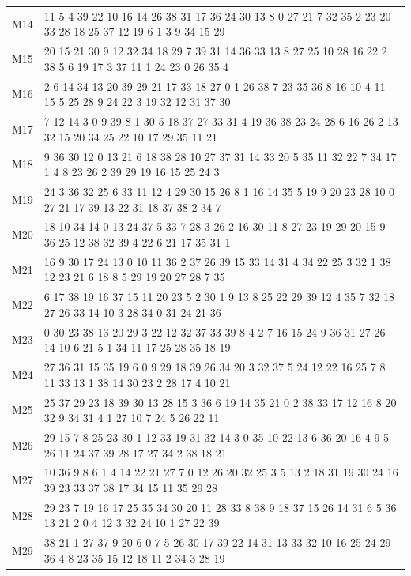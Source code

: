 \documentclass[9pt,a4paper,twocolumn,twoside]{rho-class/rho}
\begin{document}
\begin{table}[htbp]
{\begin{tabular}{@{}r@{\hspace{6pt}}l@{}}
    M14 & 11 5 4 39 22 10 16 14 26 38 31 17 36 24 30 13 8 0 27 21 7 32 35 2 23 20 33 28 18 25 37 12 19 6 1 3 9 34 15 29 \\
    M15 & 20 15 21 30 9 12 32 34 18 29 7 39 31 14 36 33 13 8 27 25 10 28 16 22 2 38 5 6 19 17 3 37 11 1 24 23 0 26 35 4 \\
    M16 & 2 6 14 34 13 20 39 29 21 17 33 18 27 0 1 26 38 7 23 35 36 8 16 10 4 11 15 5 25 28 9 24 22 3 19 32 12 31 37 30 \\
    M17 & 7 12 14 3 0 9 39 8 1 30 5 18 37 27 33 31 4 19 36 38 23 24 28 6 16 26 2 13 32 15 20 34 25 22 10 17 29 35 11 21 \\
    M18 & 9 36 30 12 0 13 21 6 18 38 28 10 27 37 31 14 33 20 5 35 11 32 22 7 34 17 1 4 8 23 26 2 39 29 19 16 15 25 24 3 \\
    M19 & 24 3 36 32 25 6 33 11 12 4 29 30 15 26 8 1 16 14 35 5 19 9 20 23 28 10 0 27 21 17 39 13 22 31 18 37 38 2 34 7 \\
    M20 & 18 10 34 14 0 13 24 37 5 33 7 28 3 26 2 16 30 11 8 27 23 19 29 20 15 9 36 25 12 38 32 39 4 22 6 21 17 35 31 1 \\
    M21 & 16 9 30 17 24 13 0 10 11 36 2 37 26 39 15 33 14 31 4 34 22 25 3 32 1 38 12 23 21 6 18 8 5 29 19 20 27 28 7 35 \\
    M22 & 6 17 38 19 16 37 15 11 20 23 5 2 30 1 9 13 8 25 22 29 39 12 4 35 7 32 18 27 26 33 14 10 3 28 34 0 31 24 21 36 \\
    M23 & 0 30 23 38 13 20 29 3 22 12 32 37 33 39 8 4 2 7 16 15 24 9 36 31 27 26 14 10 6 21 5 1 34 11 17 25 28 35 18 19 \\
    M24 & 27 36 31 15 35 19 6 0 9 29 18 39 26 34 20 3 32 37 5 24 12 22 16 25 7 8 11 33 13 1 38 14 30 23 2 28 17 4 10 21 \\
    M25 & 25 37 29 23 18 39 30 13 28 15 3 36 6 19 14 35 21 0 2 38 33 17 12 16 8 20 32 9 34 31 4 1 27 10 7 24 5 26 22 11 \\
    M26 & 29 15 7 8 25 23 30 1 12 33 19 31 32 14 3 0 35 10 22 13 6 36 20 16 4 9 5 26 11 24 37 39 28 17 27 34 2 38 18 21 \\
    M27 & 10 36 9 8 6 1 4 14 22 21 27 7 0 12 26 20 32 25 3 5 13 2 18 31 19 30 24 16 39 23 33 37 38 17 34 15 11 35 29 28 \\
    M28 & 29 23 7 19 16 17 25 35 34 30 20 11 28 33 8 38 9 18 37 15 26 14 31 6 5 36 13 21 2 0 4 12 3 32 24 10 1 27 22 39 \\
    M29 & 38 21 1 27 37 9 20 6 0 7 5 26 30 17 39 22 14 31 13 33 32 10 16 25 24 29 36 4 8 23 35 15 12 18 11 2 34 3 28 19 \\

\end{tabular}}
\end{table}
\end{document}
